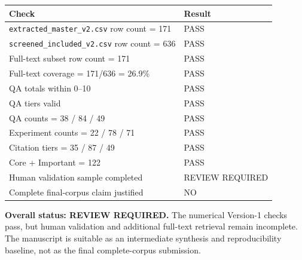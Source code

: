 \documentclass[
  journal]{IEEEtran}
\newcounter{none} %
\begin{document}
{\def\LTcaptype{none} %
\begin{tabularx}{\columnwidth}{@{}Xl@{}}
\toprule\noalign{}
Check & Result \\
\midrule\noalign{}
\endhead
\bottomrule\noalign{}
\endlastfoot
\texttt{extracted\_master\_v2.csv} row count = 171 & PASS \\
\texttt{screened\_included\_v2.csv} row count = 636 & PASS \\
Full-text subset row count = 171 & PASS \\
Full-text coverage = 171/636 = 26.9\% & PASS \\
QA totals within 0--10 & PASS \\
QA tiers valid & PASS \\
QA counts = 38 / 84 / 49 & PASS \\
Experiment counts = 22 / 78 / 71 & PASS \\
Citation tiers = 35 / 87 / 49 & PASS \\
Core + Important = 122 & PASS \\
Human validation sample completed & REVIEW REQUIRED \\
Complete final-corpus claim justified & NO \\
\end{tabularx}
}

\textbf{Overall status: REVIEW REQUIRED.} The numerical Version-1 checks
pass, but human validation and additional full-text retrieval remain
incomplete. The manuscript is suitable as an intermediate synthesis and
reproducibility baseline, not as the final complete-corpus submission.
\end{document}
